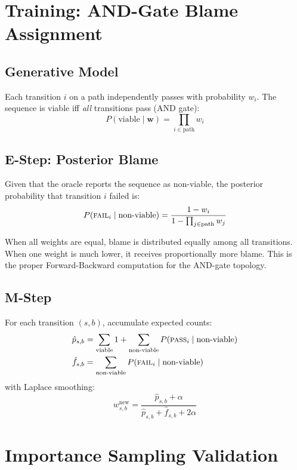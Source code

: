 \documentclass{article}
\newcommand{\PASS}{\textsc{pass}}
\newcommand{\FAIL}{\textsc{fail}}
\begin{document}
\section{Training: AND-Gate Blame Assignment}

\subsection{Generative Model}

Each transition $i$ on a path independently passes with probability
$w_i$. The sequence is viable iff \emph{all} transitions pass (AND gate):
\begin{equation}
P(\text{viable} \mid \mathbf{w}) = \prod_{i \in \text{path}} w_i
\end{equation}

\subsection{E-Step: Posterior Blame}

Given that the oracle reports the sequence as non-viable, the posterior
probability that transition $i$ failed is:
\begin{equation}\label{eq:blame}
P(\FAIL_i \mid \text{non-viable}) =
\frac{1 - w_i}{1 - \prod_{j \in \text{path}} w_j}
\end{equation}

When all weights are equal, blame is distributed equally among all
transitions. When one weight is much lower, it receives proportionally
more blame. This is the proper Forward-Backward computation for the
AND-gate topology.

\subsection{M-Step}

For each transition $(s, b)$, accumulate expected counts:
\begin{align}
\hat{p}_{s,b} &= \sum_{\text{viable}} 1
+ \sum_{\text{non-viable}} P(\PASS_i \mid \text{non-viable}) \\
\hat{f}_{s,b} &= \sum_{\text{non-viable}} P(\FAIL_i \mid \text{non-viable})
\end{align}
with Laplace smoothing:
\begin{equation}
w_{s,b}^{\text{new}} = \frac{\hat{p}_{s,b} + \alpha}
{\hat{p}_{s,b} + \hat{f}_{s,b} + 2\alpha}
\end{equation}

\section{Importance Sampling Validation}
\end{document}
